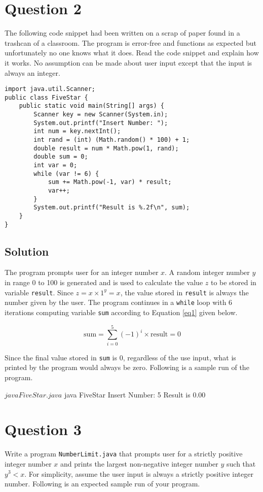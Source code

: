 \section*{Question 2}
The following code snippet had been written on a scrap of paper found in a trashcan of a classroom.
The program is error-free and functions as expected but unfortunately no one knows what it does.
Read the code snippet and explain how it works.
No assumption can be made about user input except that the input is always an integer.

\begin{lstlisting}
import java.util.Scanner;
public class FiveStar {
	public static void main(String[] args) {
		Scanner key = new Scanner(System.in);
		System.out.printf("Insert Number: ");
		int num = key.nextInt();
		int rand = (int) (Math.random() * 100) + 1;
		double result = num * Math.pow(1, rand);
		double sum = 0;
		int var = 0;
		while (var != 6) {
			sum += Math.pow(-1, var) * result;
			var++;
		}
		System.out.printf("Result is %.2f\n", sum);
	}
}
\end{lstlisting}

\subsection*{Solution}

The program prompts user for an integer number $x$.
A random integer number $y$ in range 0 to 100 is generated and is used to calculate the value $z$ to be stored in variable \texttt{result}.
Since $z = x \times 1^{y} = x$, the value stored in \texttt{result} is always the number given by the user.
The program continues in a \texttt{while} loop with 6 iterations computing variable \texttt{sum} according to Equation \ref{eq1} given below.

\begin{equation}
\text{sum} = \sum\limits_{i=0}^5 (-1)^i \times \text{result} = 0
\label{eq1}
\end{equation}

Since the final value stored in \texttt{sum} is $0$, regardless of the use input, what is printed by the program would always be zero.
Following is a sample run of the program.

\begin{terminal}
$ java FiveStar.java
$ java FiveStar
Insert Number: 5
Result is 0.00
\end{terminal}

\section*{Question 3}
Write a program \texttt{NumberLimit.java} that prompts user for a strictly positive integer number $x$ and prints the largest non-negative integer number $y$ such that $y^3 < x$.
For simplicity, assume the user input is always a strictly positive integer number.
Following is an expected sample run of your program.

